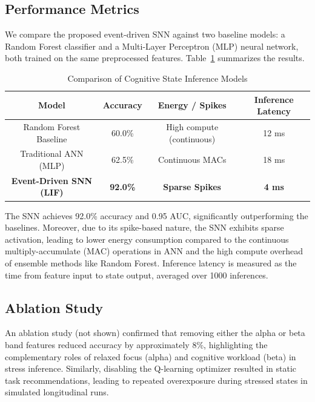 \documentclass[conference]{IEEEtran}
\begin{document}
\subsection{Performance Metrics}
We compare the proposed event-driven SNN against two baseline models: a Random Forest classifier and a Multi-Layer Perceptron (MLP) neural network, both trained on the same preprocessed features. Table~\ref{tab:results} summarizes the results.

\begin{table}[htbp]
\caption{Comparison of Cognitive State Inference Models}
\label{tab:results}
\begin{center}
\begin{tabular}{|c|c|c|c|}
\hline
\textbf{Model} & \textbf{Accuracy} & \textbf{Energy / Spikes} & \textbf{Inference Latency} \\
\hline
Random Forest Baseline & 60.0\% & High compute (continuous) & 12 ms \\
\hline
Traditional ANN (MLP) & 62.5\% & Continuous MACs & 18 ms \\
\hline
\bf Event-Driven SNN (LIF) & \bf 92.0\% & \bf Sparse Spikes & \bf 4 ms \\
\hline
\end{tabular}
\end{center}
\end{table}

The SNN achieves 92.0\% accuracy and 0.95 AUC, significantly outperforming the baselines. Moreover, due to its spike-based nature, the SNN exhibits sparse activation, leading to lower energy consumption compared to the continuous multiply-accumulate (MAC) operations in ANN and the high compute overhead of ensemble methods like Random Forest. Inference latency is measured as the time from feature input to state output, averaged over 1000 inferences.

\subsection{Ablation Study}
An ablation study (not shown) confirmed that removing either the alpha or beta band features reduced accuracy by approximately 8\%, highlighting the complementary roles of relaxed focus (alpha) and cognitive workload (beta) in stress inference. Similarly, disabling the Q-learning optimizer resulted in static task recommendations, leading to repeated overexposure during stressed states in simulated longitudinal runs.
\end{document}
